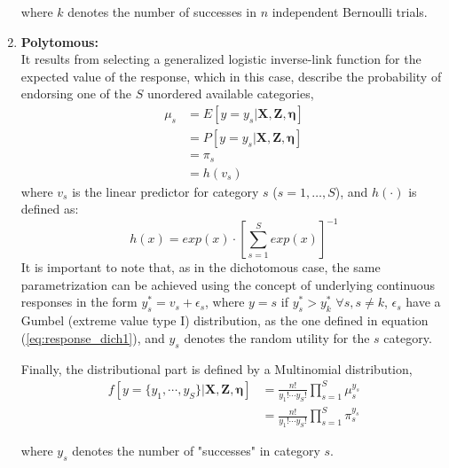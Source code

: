\begin{enumerate}
	where $k$ denotes the number of successes in $n$ independent Bernoulli trials.
	
	
			
	\item \textbf{Polytomous:} \\	
	It results from selecting a generalized logistic inverse-link function \cite{Bock_1972} for the expected value of the response, which in this case, describe the probability of endorsing one of the $S$ unordered available categories,
	\begin{equation} \label{eq:link_poly}
		\begin{split}
		\mu_{s} &= E[y=y_{s} | \mathbf{X}, \mathbf{Z}, \pmb{\eta}] \\
		&= P[y=y_{s} | \mathbf{X}, \mathbf{Z}, \pmb{\eta}] \\
		& = \pi_{s} \\
		&= h(v_{s})
		\end{split}
	\end{equation}	
	where $v_{s}$ is the linear predictor for category $s$ ($s=1, \dots, S$), and $h(\cdot)$ is defined as:
	\begin{equation} \label{eq:response_poly}
		h(x) = exp(x) \cdot \left[\sum_{s=1}^{S} exp(x)\right]^{-1}
	\end{equation}
	It is important to note that, as in the dichotomous case, the same parametrization can be achieved using the concept of underlying continuous responses in the form $y_{s}^{*} = v_{s} + \epsilon_{s}$, where $y = s$ if $y_{s}^{*} > y_{k}^{*}$ $\forall s, s \neq k$, $\epsilon_{s}$ have a Gumbel (extreme value type I) distribution, as the one defined in equation (\ref{eq:response_dich1}), and $y_{s}$ denotes the random utility for the $s$ category.
	
	
	Finally, the distributional part is defined by a Multinomial distribution,
	\begin{equation} \label{eq:dist_poly}
		\begin{split}
		f[y=\{y_{1}, \cdots, y_{S}\} | \mathbf{X}, \mathbf{Z}, \pmb{\eta}] &= \frac{n!}{y_{1}! \cdots y_{S}!} \prod_{s=1}^{S} \mu_{s}^{y_{s}} \\
		&= \frac{n!}{y_{1}! \cdots y_{S}!} \prod_{s=1}^{S} \pi_{s}^{y_{s}}
		\end{split}
	\end{equation}
	
	where $y_{s}$ denotes the number of "successes" in category $s$.

	
	

\end{enumerate}
